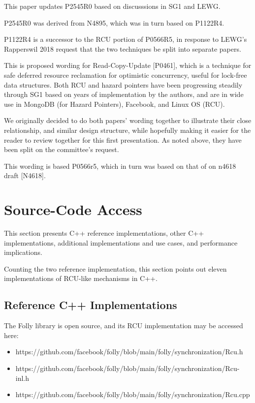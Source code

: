 This paper updates P2545R0 based on discusssions in SG1 and LEWG.

P2545R0 was derived from N4895, which was in turn based on P1122R4.

P1122R4 is a successor to the RCU portion of P0566R5, in response to
LEWG’s Rapperswil 2018 request that the two techniques be split into
separate papers.

This is proposed wording for Read-Copy-Update [P0461], which is
a technique for safe deferred resource reclamation for optimistic
concurrency, useful for lock-free data structures.
Both RCU and hazard pointers have been progressing steadily through SG1
based on years of implementation by the authors, and are in wide use in
MongoDB (for Hazard Pointers), Facebook, and Linux OS (RCU).

We originally decided to do both papers' wording together to illustrate
their close relationship, and similar design structure, while hopefully
making it easier for the reader to review together for this first
presentation.
As noted above, they have been split on the committee's request.

This wording is based P0566r5, which in turn was based on that of on
n4618 draft [N4618].

\section{Source-Code Access}
\label{sec:Source-Code Access}

This section presents C++ reference implementations, other
C++ implementations, additional implementations and use cases,
and performance implications.

Counting the two reference implementation, this section points out
eleven implementations of RCU-like mechanisms in C++.

\subsection{Reference C++ Implementations}
\label{sec:Reference C++ Implementations}

The Folly library is open source, and its RCU implementation may be
accessed here:

\begin{itemize}
\item	https://github.com/facebook/folly/blob/main/folly/synchronization/Rcu.h
\item	https://github.com/facebook/folly/blob/main/folly/synchronization/Rcu-inl.h
\item	https://github.com/facebook/folly/blob/main/folly/synchronization/Rcu.cpp
\end{itemize}

